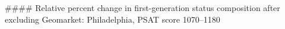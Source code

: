 #### Relative percent change in first-generation status composition after excluding Geomarket: Philadelphia, PSAT score 1070–1180
